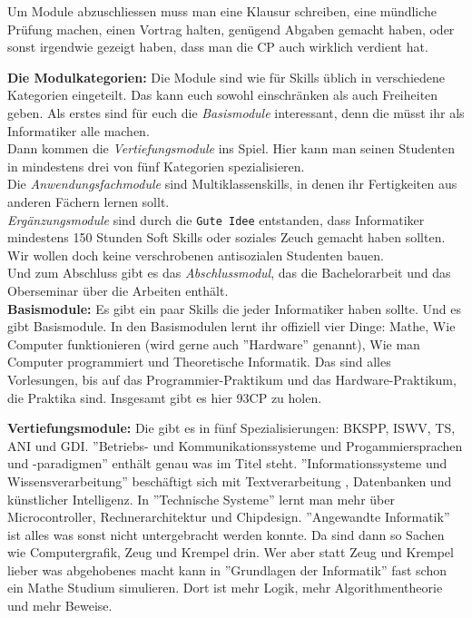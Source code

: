 Um Module abzuschliessen muss man eine Klausur schreiben, eine m\"undliche
Pr\"ufung machen, einen Vortrag halten, gen\"ugend Abgaben gemacht haben, oder
sonst irgendwie gezeigt haben, dass man die CP auch wirklich verdient hat.


\textbf{Die Modulkategorien:}
Die Module sind wie f\"ur Skills \"ublich in verschiedene Kategorien
eingeteilt. Das kann euch sowohl einschr\"anken als auch Freiheiten geben.
Als erstes sind f\"ur euch die \emph{Basismodule} interessant, denn die m\"usst ihr als Informatiker alle machen.\\
Dann kommen die \emph{Vertiefungsmodule} ins Spiel. Hier kann man seinen Studenten in mindestens drei von f\"unf Kategorien spezialisieren.\\
Die \emph{Anwendungsfachmodule} sind Multiklassenskills, in denen ihr Fertigkeiten aus anderen F\"achern lernen sollt.\\
\emph{Erg\"anzungsmodule} sind durch die \texttt{Gute Idee\texttrademark} entstanden, dass Informatiker mindestens 150 Stunden Soft Skills oder soziales Zeuch gemacht haben sollten. Wir wollen doch keine verschrobenen antisozialen Studenten bauen.\\
Und zum Abschluss gibt es das \emph{Abschlussmodul}, das die Bachelorarbeit und das Oberseminar \"uber die Arbeiten enth\"alt.\\

\textbf{Basismodule:}
Es gibt ein paar Skills die jeder Informatiker haben sollte. Und es gibt
Basismodule. In den Basismodulen lernt ihr offiziell vier Dinge: Mathe, Wie
Computer funktionieren (wird gerne auch ''Hardware'' genannt), Wie man Computer
programmiert und Theoretische Informatik. Das sind alles Vorlesungen, bis auf
das Programmier-Praktikum und das Hardware-Praktikum, die Praktika sind.
Insgesamt gibt es hier 93CP zu holen.

\textbf{Vertiefungsmodule:}
Die gibt es in f\"unf Spezialisierungen: BKSPP, ISWV, TS, ANI und GDI. ''Betriebs-
und Kommunikationssysteme und Progammiersprachen und -paradigmen'' enth\"alt
genau was im Titel steht. ''Informationssysteme und Wissensverarbeitung''
besch\"aftigt sich mit Textverarbeitung , Datenbanken und k\"unstlicher
Intelligenz. In ''Technische Systeme'' lernt man mehr \"uber Microcontroller,
Rechnerarchitektur und Chipdesign. ''Angewandte Informatik'' ist alles was
sonst nicht untergebracht werden konnte. Da sind dann so Sachen wie
Computergrafik, Zeug und Krempel drin. Wer aber statt Zeug und Krempel lieber
was abgehobenes macht kann in ''Grundlagen der Informatik'' fast schon ein
Mathe Studium simulieren. Dort ist mehr Logik, mehr Algorithmentheorie und mehr
Beweise.

